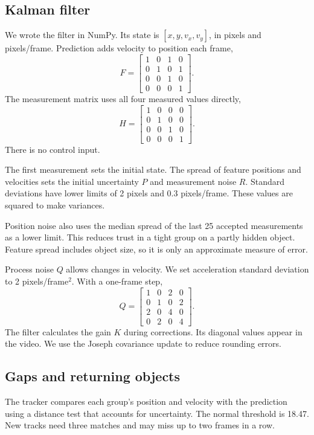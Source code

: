 \documentclass[conference]{assets/latex/IEEEtran}
\begin{document}
\subsection{Kalman filter}
We wrote the filter in NumPy. Its state is $[x,y,v_x,v_y]$, in pixels and pixels/frame. Prediction adds velocity to position each frame,
\begin{equation}
F=\begin{bmatrix}
1&0&1&0\\0&1&0&1\\0&0&1&0\\0&0&0&1
\end{bmatrix}.
\end{equation}
The measurement matrix uses all four measured values directly,
\begin{equation}
H=\begin{bmatrix}
1&0&0&0\\0&1&0&0\\0&0&1&0\\0&0&0&1
\end{bmatrix}.
\end{equation}
There is no control input.

The first measurement sets the initial state. The spread of feature positions and velocities sets the initial uncertainty $P$ and measurement noise $R$. Standard deviations have lower limits of 2 pixels and 0.3 pixels/frame. These values are squared to make variances.

Position noise also uses the median spread of the last 25 accepted measurements as a lower limit. This reduces trust in a tight group on a partly hidden object. Feature spread includes object size, so it is only an approximate measure of error.

Process noise $Q$ allows changes in velocity. We set acceleration standard deviation to 2 pixels/frame$^2$. With a one-frame step,
\begin{equation}
Q=\begin{bmatrix}
1&0&2&0\\0&1&0&2\\2&0&4&0\\0&2&0&4
\end{bmatrix}.
\end{equation}
The filter calculates the gain $K$ during corrections. Its diagonal values appear in the video. We use the Joseph covariance update to reduce rounding errors.

\subsection{Gaps and returning objects}
The tracker compares each group's position and velocity with the prediction using a distance test that accounts for uncertainty. The normal threshold is 18.47. New tracks need three matches and may miss up to two frames in a row.
\end{document}
